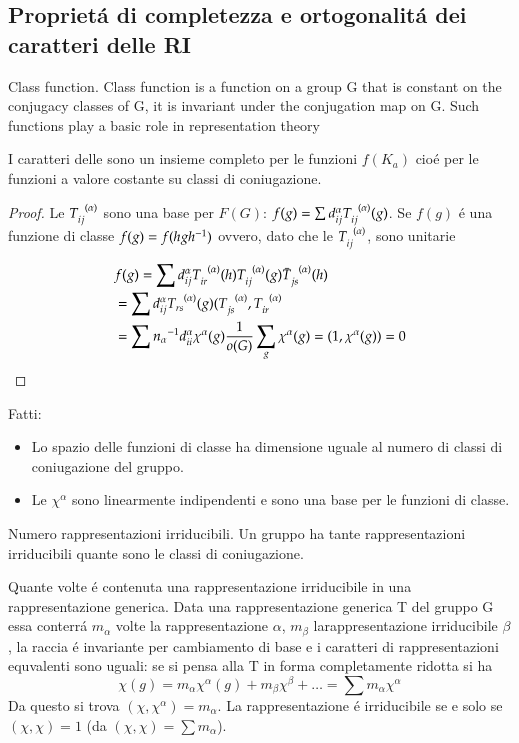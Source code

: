 \documentclass[oneside,12pt]{memoir}
\begin{document}
\subsection{Propriet\'a di completezza e ortogonalit\'a dei caratteri delle RI}

\begin{definition}{Class function.}
Class function is a function on a group G that is constant on the conjugacy classes of G, it is invariant under the conjugation map on G. Such functions play a basic role in representation theory
\end{definition}


I caratteri delle \RIs{} sono un insieme completo per le funzioni $f(K_a)$ cio\'e per le funzioni a valore costante su classi di coniugazione.
\begin{proof}
Le $\rapreg{ij}{\alpha}$ sono una base per $F(G)$: $f(g)=\sum d_{ij}^{\alpha}\rapreg{ij}{\alpha}(g)$. Se $f(g)$ \'e una funzione di classe $f(g)=f(hg{{h}^{-1}})$ ovvero, dato che le $\rapreg{ij}{\alpha}$, sono unitarie

\begin{align*}
&f(g)=\sum d_{ij}^{\alpha}\rapreg{ir}{\alpha}(h)\rapreg{ij}{\alpha}(g)\rapregb{js}{\alpha}(h)\\
&=\sum d_{ij}^{\alpha}\rapreg{rs}{\alpha}(g)
(\rapreg{js}{\alpha},\rapreg{ir}{\alpha}\\
&=\sum\invers{n_{\alpha}}d_{ii}^{\alpha}\chi^{\alpha}(g)\frac{1}{o(G)}\sum_g\chi^{\alpha}(g)=(1,\chi^{\alpha}(g))=0
\end{align*}

\end{proof}

Fatti:
\begin{itemize}
\item Lo spazio delle funzioni di classe ha dimensione uguale al numero di classi di coniugazione del gruppo.
\item Le $\chi^{\alpha}$ sono linearmente indipendenti e sono una base per le funzioni di classe.
\end{itemize}

\begin{usefull}{Numero rappresentazioni irriducibili.}
Un gruppo ha tante rappresentazioni irriducibili quante sono le classi di coniugazione.
\end{usefull}

\begin{usefull}{Quante volte \'e contenuta una rappresentazione irriducibile in una rappresentazione generica.}
Data una rappresentazione generica T del gruppo G essa conterr\'a $m_{\alpha}$ volte la rappresentazione $\alpha$, $m_{\beta}$ larappresentazione irriducibile $\beta$, la raccia \'e invariante per cambiamento di base e i caratteri di rappresentazioni equvalenti sono uguali: se si pensa alla T in forma completamente ridotta si ha
\begin{equation*}
\chi(g)=m_{\alpha}\chi^{\alpha}(g)+m_{\beta}\chi^{\beta}+\ldots=\sum m_{\alpha}\chi^{\alpha}
\end{equation*}
Da questo si trova $(\chi,\chi^{\alpha})=m_{\alpha}$. La rappresentazione \'e irriducibile se e solo se $(\chi,\chi)=1$ (da $(\chi,\chi)=\sum m_{\alpha}$).
\end{usefull}
\end{document}
